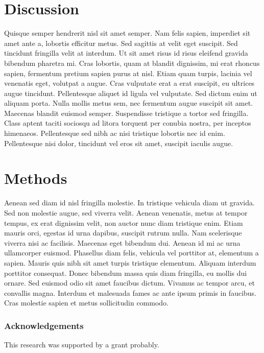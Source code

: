 \documentclass[10pt,twocolumn,letterpaper]{article}
\begin{document}
\section{Discussion}
Quisque semper hendrerit nisl sit amet semper. Nam felis sapien, imperdiet sit amet ante a, lobortis efficitur metus. Sed sagittis at velit eget suscipit. Sed tincidunt fringilla velit at interdum. Ut sit amet risus id risus eleifend gravida bibendum pharetra mi. Cras lobortis, quam at blandit dignissim, mi erat rhoncus sapien, fermentum pretium sapien purus at nisl. Etiam quam turpis, lacinia vel venenatis eget, volutpat a augue. Cras vulputate erat a erat suscipit, eu ultrices augue tincidunt. Pellentesque aliquet id ligula vel vulputate. Sed dictum enim ut aliquam porta. Nulla mollis metus sem, nec fermentum augue suscipit sit amet. Maecenas blandit euismod semper. Suspendisse tristique a tortor sed fringilla. Class aptent taciti sociosqu ad litora torquent per conubia nostra, per inceptos himenaeos. Pellentesque sed nibh ac nisi tristique lobortis nec id enim. Pellentesque nisi dolor, tincidunt vel eros sit amet, suscipit iaculis augue.

\section{Methods}
Aenean sed diam id nisl fringilla molestie. In tristique vehicula diam ut gravida. Sed non molestie augue, sed viverra velit. Aenean venenatis, metus at tempor tempus, ex erat dignissim velit, non auctor nunc diam tristique enim. Etiam mauris orci, egestas id urna dapibus, suscipit rutrum nulla. Nam scelerisque viverra nisi ac facilisis. Maecenas eget bibendum dui. Aenean id mi ac urna ullamcorper euismod. Phasellus diam felis, vehicula vel porttitor at, elementum a sapien. Mauris quis nibh sit amet turpis tristique elementum. Aliquam interdum porttitor consequat. Donec bibendum massa quis diam fringilla, eu mollis dui ornare. Sed euismod odio sit amet faucibus dictum. Vivamus ac tempor arcu, et convallis magna. Interdum et malesuada fames ac ante ipsum primis in faucibus. Cras molestie sapien et metus sollicitudin commodo.



\subsubsection*{Acknowledgements}
This research was supported by a grant probably.



\setlength{\bibleftmargin}{.125in}
\setlength{\bibindent}{-\bibleftmargin}

\end{document}
